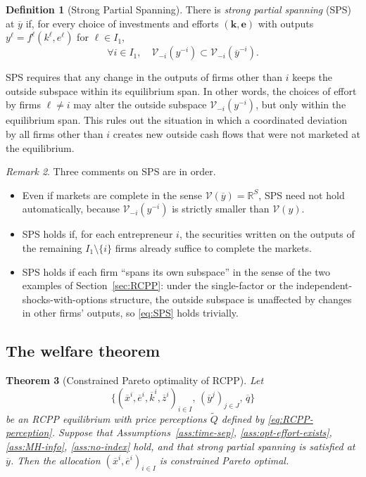 \documentclass[11pt,a4paper,oneside]{book}
\def\R{\mathbb{R}}
\theoremstyle{plain}
\newtheorem{theorem}{Theorem}[chapter]
\theoremstyle{definition}
\newtheorem{definition}[theorem]{Definition}
\theoremstyle{remark}
\newtheorem{remark}[theorem]{Remark}
\numberwithin{equation}{chapter}
\begin{document}
\begin{definition}[Strong Partial Spanning]\label{def:SPS}
There is \emph{strong partial spanning} (SPS) at $\overline{y}$ if, for every choice of investments and efforts $(\bm{k}, \bm{e})$ with outputs $y^\ell = f^\ell(k^\ell, e^\ell)$ for $\ell \in I_1$,
\begin{equation}\label{eq:SPS}
  \forall i \in I_1, \quad \mathcal{V}_{-i}(y^{-i}) \subset \mathcal{V}_{-i}(\overline{y}^{-i}).
\end{equation}
\end{definition}

SPS requires that any change in the outputs of firms other than $i$ keeps the outside subspace within its equilibrium span.
In other words, the choices of effort by firms $\ell \neq i$ may alter the outside subspace $\mathcal{V}_{-i}(y^{-i})$, but only within the equilibrium span.
This rules out the situation in which a coordinated deviation by all firms other than $i$ creates new outside cash flows that were not marketed at the equilibrium.

\begin{remark}\label{rem:SPS-examples}
Three comments on SPS are in order.
\begin{itemize}
  \item Even if markets are complete in the sense $\mathcal{V}(\overline{y}) = \R^S$, SPS need not hold automatically, because $\mathcal{V}_{-i}(y^{-i})$ is strictly smaller than $\mathcal{V}(y)$.
  \item SPS holds if, for each entrepreneur $i$, the securities written on the outputs of the remaining $I_1 \setminus \{i\}$ firms already suffice to complete the markets.
  \item SPS holds if each firm ``spans its own subspace'' in the sense of the two examples of Section~\ref{sec:RCPP}: under the single-factor or the independent-shocks-with-options structure, the outside subspace is unaffected by changes in other firms' outputs, so \eqref{eq:SPS} holds trivially.
\end{itemize}
\end{remark}

\subsection{The welfare theorem}

\begin{theorem}[Constrained Pareto optimality of RCPP]\label{thm:MH-welfare}
Let
\begin{equation*}
  \bigl\{ (\overline{x}^i, \overline{e}^i, \overline{k}^i, \overline{z}^i)_{i \in I}, \, (\overline{y}^j)_{j \in J}, \, \overline{q} \bigr\}
\end{equation*}
be an RCPP equilibrium with price perceptions $\widetilde{Q}$ defined by \eqref{eq:RCPP-perception}.
Suppose that Assumptions~\ref{ass:time-sep}, \ref{ass:opt-effort-exists}, \ref{ass:MH-info}, \ref{ass:no-index} hold, and that strong partial spanning is satisfied at $\overline{y}$.
Then the allocation $(\overline{x}^i, \overline{e}^i)_{i \in I}$ is constrained Pareto optimal.
\end{theorem}
\end{document}
